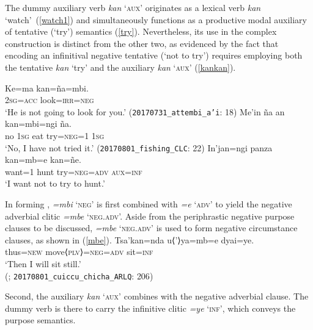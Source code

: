 \documentclass[output=paper,colorlinks,citecolor=brown]{langscibook}
\begin{document}
\hspace*{-1.8pt}The dummy auxiliary verb \emph{kan} `\textsc{aux}' originates as a lexical verb \emph{kan} `watch'~(\ref{watch1}) and simultaneously functions as a productive modal auxiliary of tentative (\ie `try') semantics (\ref{try}). Nevertheless, its use in the complex construction  is distinct from the other two, as evidenced by the fact that encoding an infinitival negative tentative (\ie `not to try') requires employing both the tentative \emph{kan} `try' and the auxiliary \emph{kan} `\textsc{aux}' (\ref{kankan}).
\begin{exe}
    \ex \label{watch1}
    \gll %
    Ke=ma      kan=ña=mbi. \\
    \textsc{2sg=acc} look=\textsc{irr=neg} \\
    \glt  `He is not going to look for you.'
    \hfill (\texttt{20170731\_attembi\_a'i}: {\textsc{18}})
    \ex \label{try}
    \gll Me'in ña an kan=mbi=ngi ña.\\
         no    \textsc{1sg} eat try=\textsc{neg=}1 \textsc{1sg}\\
    \glt `No, I have not tried it.' 
    \hfill (\texttt{20170801\_fishing\_CLC}: {\textsc{22}})
    \ex \label{kankan}
    \gll In'jan=ngi panza kan=mb=e kan=ñe.   \\
         want\textsc{=}1  hunt  try=\textsc{neg=adv} \textsc{aux=inf}  \\
    \glt `I want not to try to hunt.'
\end{exe}
    
In forming , \emph{=mbi} `\textsc{neg}' is first combined with \emph{=e} `\textsc{adv}' to yield the negative adverbial clitic \emph{=mbe} `\textsc{neg.adv}'. Aside from the periphrastic negative purpose clauses to be discussed, \emph{=mbe} `\textsc{neg.adv}' is used to form negative circumstance clauses, as shown in (\ref{mbe}).
    \ea \label{mbe} %
    \gll Tsa'kan=nda {{\ob}u⟨'⟩ya=mb=e{\cb}}          dyai=ye. \\
         thus=\textsc{new} move⟨\textsc{plv}⟩\textsc{=neg=adv} sit=\textsc{inf} \\
    \glt `Then I will sit still.'\\
    \hfill (\cite{fischerhengeveld}; \texttt{20170801\_cuiccu\_chicha\_ARLQ}: {\textsc{206}})
    \z 
    
Second, the auxiliary \emph{kan} `\textsc{aux}' combines with the negative adverbial clause. The dummy verb is there to carry the infinitive clitic \emph{=ye} `\textsc{inf}', which conveys the purpose semantics.
    
\end{document}
